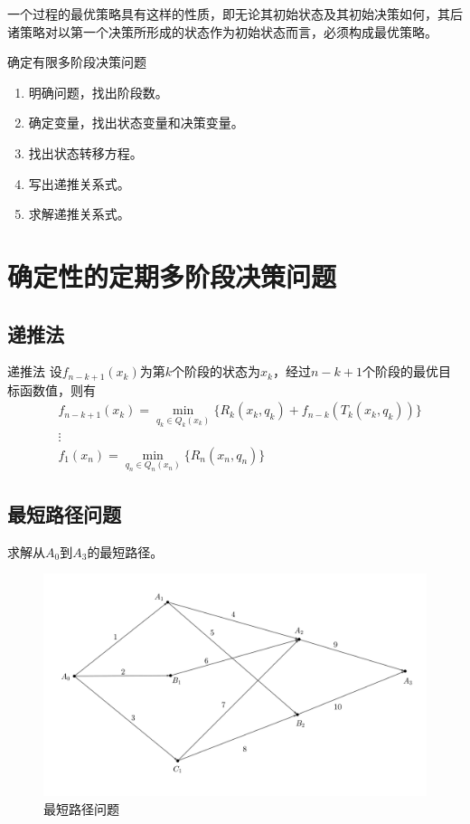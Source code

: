 \documentclass[lang = cn, scheme = chinese, thmcnt = section]{elegantbook}
\begin{document}
一个过程的最优策略具有这样的性质，即无论其初始状态及其初始决策如何，其后诸策略对以第一个决策所形成的状态作为初始状态而言，必须构成最优策略。

\begin{theorem}{确定有限多阶段决策问题}
	\begin{enumerate}
		\item 明确问题，找出阶段数。
		\item 确定变量，找出状态变量和决策变量。
		\item 找出状态转移方程。
		\item 写出递推关系式。
		\item 求解递推关系式。
	\end{enumerate}
\end{theorem}

\section{确定性的定期多阶段决策问题}

\subsection{递推法}

\begin{theorem}{递推法}
	设$f_{n-k+1}(x_k)$为第$k$个阶段的状态为$x_k$，经过$n-k+1$个阶段的最优目标函数值，则有
	\begin{align*}
		& f_{n-k+1}(x_k)=\min_{q_k\in Q_k(x_k)}\{ R_k(x_k,q_k)+f_{n-k}(T_k(x_k,q_k)) \}\\
		& \vdots\\
		& f_1(x_n)=\min_{q_n\in Q_n(x_n)}\{ R_n(x_n,q_n) \}
	\end{align*}
\end{theorem}

\subsection{最短路径问题}

\begin{example}
	求解从$A_0$到$A_3$的最短路径。
	\begin{figure}[H]
		\centering
		\includegraphics[scale = 0.15]{../图/最短路径}
		\caption{最短路径问题}
	\end{figure}
\end{example}
\end{document}
